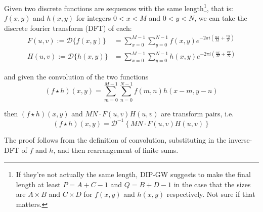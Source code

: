 		\begin{theorem}
		Given two discrete functions are sequences with the same length\footnote{If they're
			not actually the same length, DIP-GW suggests to make the final length at least
			$P = A+C-1$ and $Q = B+D-1$ in the case that the sizes are $A\times B$ and $C\times D$ for $f(x,y)$ and  $h(x,y)$ respectively. Not sure if that matters.}, that is:
		$f(x,y)$ and $h(x,y)$ for integers $0 < x < M$ and $0 < y < N$, we can take the discrete fourier transform (DFT) of each:
		\begin{align}
		F(u,v) := \mathcal{D}\{f(x,y)\} &=
						\sum_{x=0}^{M-1} \sum_{y=0}^{N-1} f(x,y)
						e^{-2\pi i \left(\frac{ux}{M} + \frac{vy}{N}\right)} \\	
		   H(u,v) := \mathcal{D}\{h(x,y)\} &=
						\sum_{x=0}^{M-1} \sum_{y=0}^{N-1} h(x,y)
						e^{-2\pi i \left(\frac{ux}{M} + \frac{vy}{N}\right)}
		\end{align}
		
		and given the convolution of the two functions
		\begin{equation}
		\left(f \star h\right)(x,y) = \sum_{m=0}^{M-1} \sum_{n=0}^{N-1} f(m,n)h(x-m,y-n)
		\end{equation}
		
		then $\left(f \star h\right)(x,y)$ and $MN\cdot F(u,v)H(u,v)$ are transform pairs, i.e.
		\begin{equation}
		\left(f \star h\right)(x,y) = \mathcal{D}^{-1}\left\{MN\cdot F(u,v)H(u,v)\right\}
		\end{equation}
		\end{theorem}
		The proof follows from the definition of convolution, substituting in the inverse-DFT of $f$ and $h$, and then rearrangement of finite sums.
